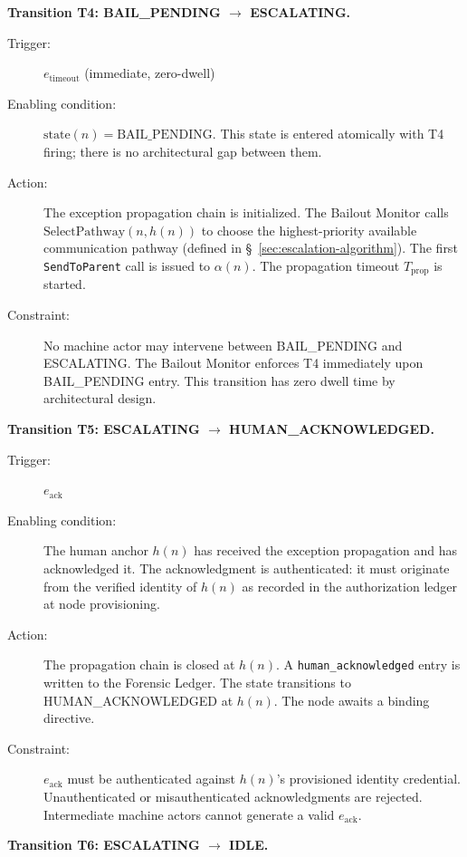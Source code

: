 \bigskip
\noindent\textbf{Transition T4: BAIL\_PENDING $\rightarrow$ ESCALATING.}

\begin{description}
\item[Trigger:] $e_{\text{timeout}}$ (immediate, zero-dwell)
\item[Enabling condition:] $\text{state}(n) = \text{BAIL\_PENDING}$. This state is entered atomically with T4 firing; there is no architectural gap between them.
\item[Action:] The exception propagation chain is initialized. The Bailout Monitor calls $\text{SelectPathway}(n, h(n))$ to choose the highest-priority available communication pathway (defined in \S~\ref{sec:escalation-algorithm}). The first \texttt{SendToParent} call is issued to $\alpha(n)$. The propagation timeout $T_{\text{prop}}$ is started.
\item[Constraint:] No machine actor may intervene between BAIL\_PENDING and ESCALATING. The Bailout Monitor enforces T4 immediately upon BAIL\_PENDING entry. This transition has zero dwell time by architectural design.
\end{description}

\bigskip
\noindent\textbf{Transition T5: ESCALATING $\rightarrow$ HUMAN\_ACKNOWLEDGED.}

\begin{description}
\item[Trigger:] $e_{\text{ack}}$
\item[Enabling condition:] The human anchor $h(n)$ has received the exception propagation and has acknowledged it. The acknowledgment is authenticated: it must originate from the verified identity of $h(n)$ as recorded in the authorization ledger at node provisioning.
\item[Action:] The propagation chain is closed at $h(n)$. A \texttt{human\_acknowledged} entry is written to the Forensic Ledger. The state transitions to HUMAN\_ACKNOWLEDGED at $h(n)$. The node awaits a binding directive.
\item[Constraint:] $e_{\text{ack}}$ must be authenticated against $h(n)$'s provisioned identity credential. Unauthenticated or misauthenticated acknowledgments are rejected. Intermediate machine actors cannot generate a valid $e_{\text{ack}}$.
\end{description}

\bigskip
\noindent\textbf{Transition T6: ESCALATING $\rightarrow$ IDLE.}

